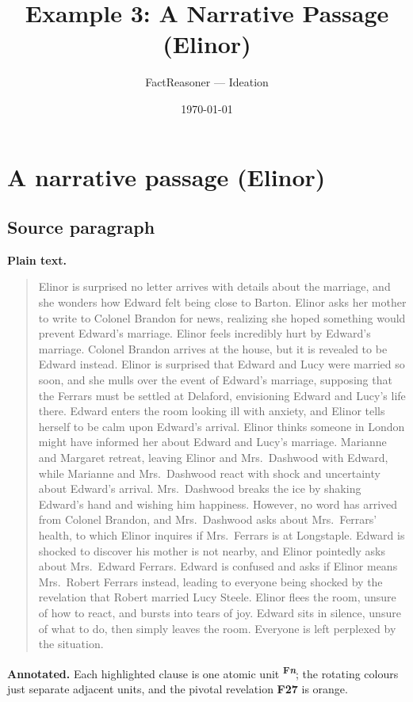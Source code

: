 \documentclass[11pt]{article}
\title{Example 3: A Narrative Passage (Elinor)}
\author{FactReasoner --- Ideation}
\date{\today}
\begin{document}
\maketitle
\section{A narrative passage (Elinor)}

\subsection*{Source paragraph}

\noindent\textbf{Plain text.}
\begin{quote}
Elinor is surprised no letter arrives with details about the marriage, and she
wonders how Edward felt being close to Barton. Elinor asks her mother to write to
Colonel Brandon for news, realizing she hoped something would prevent Edward's
marriage. Elinor feels incredibly hurt by Edward's marriage. Colonel Brandon
arrives at the house, but it is revealed to be Edward instead. Elinor is surprised
that Edward and Lucy were married so soon, and she mulls over the event of
Edward's marriage, supposing that the Ferrars must be settled at Delaford,
envisioning Edward and Lucy's life there. Edward enters the room looking ill with
anxiety, and Elinor tells herself to be calm upon Edward's arrival. Elinor thinks
someone in London might have informed her about Edward and Lucy's marriage.
Marianne and Margaret retreat, leaving Elinor and Mrs.~Dashwood with Edward,
while Marianne and Mrs.~Dashwood react with shock and uncertainty about Edward's
arrival. Mrs.~Dashwood breaks the ice by shaking Edward's hand and wishing him
happiness. However, no word has arrived from Colonel Brandon, and Mrs.~Dashwood
asks about Mrs.~Ferrars' health, to which Elinor inquires if Mrs.~Ferrars is at
Longstaple. Edward is shocked to discover his mother is not nearby, and Elinor
pointedly asks about Mrs.~Edward Ferrars. Edward is confused and asks if Elinor
means Mrs.~Robert Ferrars instead, leading to everyone being shocked by the
revelation that Robert married Lucy Steele. Elinor flees the room, unsure of how
to react, and bursts into tears of joy. Edward sits in silence, unsure of what to
do, then simply leaves the room. Everyone is left perplexed by the situation.
\end{quote}

\noindent\textbf{Annotated.} Each highlighted clause is one atomic unit
\textsuperscript{\textbf{\scriptsize F\textit{n}}}; the rotating colours just
separate adjacent units, and the pivotal revelation \textbf{F27} is orange.
\end{document}

